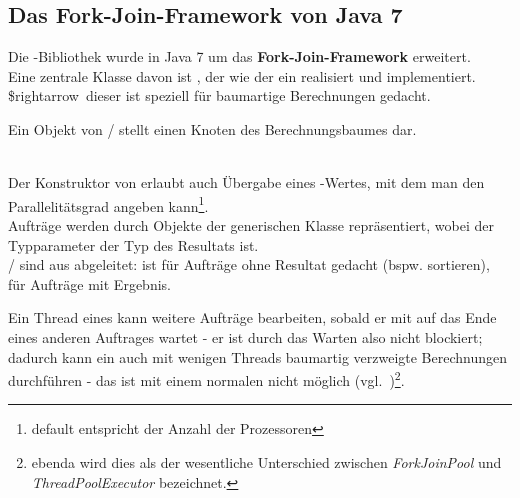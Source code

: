 \subsection{Das Fork-Join-Framework von Java 7}

Die -Bibliothek wurde in Java 7 um das \textbf{Fork-Join-Framework} erweitert.\\

\noindent
Eine zentrale Klasse davon ist , der wie der  ein  realisiert und  implementiert.\\

\noindent
\$rightarrow\ dieser  ist speziell für baumartige Berechnungen gedacht.

\begin{tcolorbox}[enlarge top by=0.5cm,enlarge bottom by=0.5cm]
    Ein Objekt von  /  stellt einen Knoten des Berechnungsbaumes dar.
\end{tcolorbox}\\

\noindent
Der Konstruktor von  erlaubt auch Übergabe eines -Wertes, mit dem man den Parallelitätsgrad angeben kann\footnote{default entspricht der Anzahl der Prozessoren}.\\

\noindent
Aufträge werden durch Objekte der generischen Klasse  repräsentiert, wobei der Typparameter der Typ des Resultats ist.\\

\noindent
{}/ sind aus  abgeleitet:  ist für Aufträge ohne Resultat gedacht (bspw. sortieren),  für Aufträge mit Ergebnis.\\

\begin{tcolorbox}
Ein Thread eines  kann weitere Aufträge bearbeiten, sobald er mit  auf das Ende eines anderen Auftrages wartet - er ist durch das Warten also nicht blockiert; dadurch kann ein  auch mit wenigen Threads baumartig verzweigte Berechnungen durchführen - das ist mit einem normalen  nicht möglich (vgl.~\cite[168]{Oec22})\footnote{
    ebenda wird dies als der wesentliche Unterschied zwischen \textit{ForkJoinPool} und \textit{ThreadPoolExecutor} bezeichnet.
}.\\
\end{tcolorbox}

